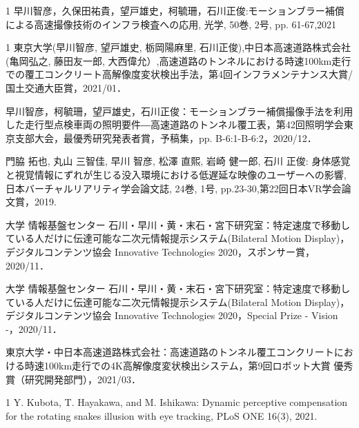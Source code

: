 \begin{招待論文}{1}
早川智彦，久保田祐貴，望戸雄史，柯毓珊，石川正俊:モーションブラー補償による高速撮像技術のインフラ検査への応用, 光学, 50巻, 2号, pp. 61-67,2021

\end{招待論文}

\begin{受賞}{1}
東京大学(早川智彦, 望戸雄史, 栃岡陽麻里, 石川正俊),中日本高速道路株式会社(亀岡弘之, 藤田友一郎, 大西偉允）,高速道路のトンネルにおける時速100km走行での覆工コンクリート高解像度変状検出手法，第4回インフラメンテナンス大賞/国土交通大臣賞，2021/01．

早川智彦，柯毓珊，望戸雄史，石川正俊：モーションブラー補償撮像手法を利用した走行型点検車両の照明要件―高速道路のトンネル覆工表，第42回照明学会東京支部大会，最優秀研究発表者賞，予稿集，pp. B-6:1-B-6:2，2020/12．

門脇 拓也, 丸山 三智佳, 早川 智彦, 松澤 直熙, 岩崎 健一郎, 石川 正俊: 身体感覚と視覚情報にずれが生じる没入環境における低遅延な映像のユーザーへの影響,日本バーチャルリアリティ学会論文誌, 24巻, 1号, pp.23-30,第22回日本VR学会論文賞，2019.

大学 情報基盤センター 石川・早川・黄・末石・宮下研究室：特定速度で移動している人だけに伝達可能な二次元情報提示システム(Bilateral Motion Display)，デジタルコンテンツ協会 Innovative Technologies 2020，スポンサー賞，2020/11．

大学 情報基盤センター 石川・早川・黄・末石・宮下研究室：特定速度で移動している人だけに伝達可能な二次元情報提示システム(Bilateral Motion Display)，デジタルコンテンツ協会 Innovative Technologies 2020，Special Prize - Vision -，2020/11．

東京大学・中日本高速道路株式会社：高速道路のトンネル覆工コンクリートにおける時速100km走行での4K高解像度変状検出システム，第9回ロボット大賞 優秀賞（研究開発部門），2021/03．

\end{受賞}

\begin{雑誌論文}{1}
Y. Kubota, T. Hayakawa, and M. Ishikawa: Dynamic perceptive compensation for the rotating snakes illusion with eye tracking, PLoS ONE 16(3), 2021.

\end{雑誌論文}

